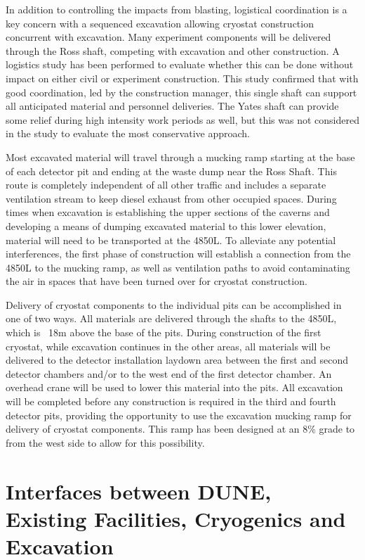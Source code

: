In addition to controlling the impacts from blasting, logistical coordination is a key concern with a sequenced excavation allowing cryostat construction concurrent with excavation. Many experiment components will be delivered through the Ross shaft, competing with excavation and other construction. A logistics study\cite{lbnf-logistics} has been performed to evaluate whether this can be done without impact on either civil or experiment construction.  This study confirmed that with good coordination, led by the construction manager, this single shaft can support all anticipated material and personnel deliveries.  The Yates shaft can provide some relief during high intensity work periods as well, but this was not considered in the study to evaluate the most conservative approach.

Most excavated material will travel through a mucking ramp starting at the base of each detector pit and ending at the waste dump near the Ross Shaft. This route is completely independent of all other traffic and includes a separate ventilation stream to keep diesel exhaust from other occupied spaces. During times when excavation is establishing the upper sections of the caverns and developing a means of dumping excavated material to this lower elevation, material will need to be transported at the 4850L. To alleviate any potential interferences, the first phase of construction will establish a connection from the 4850L to the mucking ramp, as well as ventilation paths to avoid contaminating the air in spaces that have been turned over for cryostat construction. 

Delivery of cryostat components to the individual pits can be accomplished in one of two ways. All materials are delivered through the shafts to the 4850L, which is ~18m above the base of the pits. During construction of the first cryostat, while excavation continues in the other areas, all materials will be delivered to the detector installation laydown area between the first and second detector chambers and/or to the west end of the first detector chamber. An overhead crane will be used to lower this material into the pits. All excavation will be completed before any construction is required in the third and fourth detector pits, providing the opportunity to use the excavation mucking ramp for delivery of cryostat components. This ramp has been designed at an 8\% grade to from the west side to allow for this possibility. 

\section{Interfaces between DUNE, Existing Facilities, Cryogenics and Excavation}
\label{sec:fscf-excav-interfaces}

